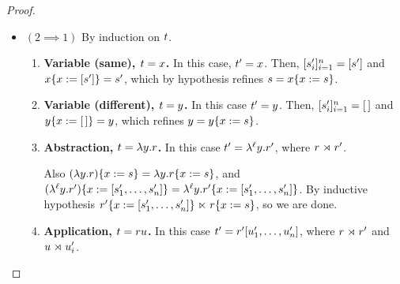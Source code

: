\begin{proof}
\begin{itemize}
\item $(2 )$
  By induction on $t$.
  \begin{enumerate}
  \item {\bf Variable (same), $t = x$.} In this case, $t' = x$.
    Then, $ = [\tmtwo']$
      and $x\{x := [s']\} = s'$,
      which by hypothesis refines $s = x\{x := s\}$.
  \item {\bf Variable (different), $t = y$.} In this  case $t' = y$.
    Then, $ = \emptylset$
      and $y\{x := [\,]\} = y$,
      which refines $y = y\{x := s\}$.
  \item {\bf Abstraction, $t = \lambda y. r$.}
    In this case $\tm' = $,
      where $\tmfour {} \tmfour'$.

    Also $(\lambda y. r)\{x := s\} = \lambda y. r\{x := s\}$,
    and $ =
         $.
    By inductive hypothesis $  \subs{\tmfour}{\var}{\tmtwo}$,
    so we are done.
  \item {\bf Application, $t = r u$.}
    In this case $t' = r' [u'_1, \hdots, u'_n]$,
      where $\tmfour {} \tmfour'$
      and $\tmthree {} \tmthree'_i$.


\end{enumerate}
\end{itemize}
\end{proof}
